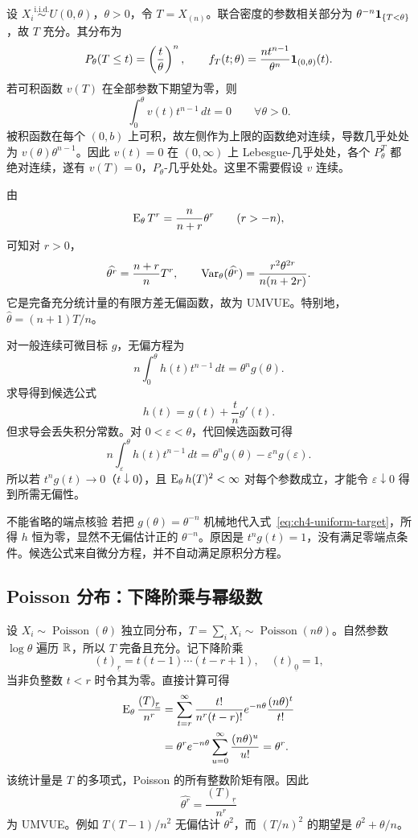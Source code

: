 设 $X_i\overset{\mathrm{i.i.d.}}\sim U(0,\theta)$，$\theta>0$，令 $T=X_{(n)}$。联合密度的参数相关部分为 $\theta^{-n}\mathbf 1_{\{T<\theta\}}$，故 $T$ 充分。其分布为
\[
 P_\theta(T\leq t)=\left(\frac t\theta\right)^n,
 \qquad
 f_T(t;\theta)=\frac{nt^{n-1}}{\theta^n}\mathbf 1_{(0,\theta)}(t).
\]
若可积函数 $v(T)$ 在全部参数下期望为零，则
\[
 \int_0^\theta v(t)t^{n-1}\,dt=0\qquad\forall\theta>0.
\]
被积函数在每个 $(0,b)$ 上可积，故左侧作为上限的函数绝对连续，导数几乎处处为 $v(\theta)\theta^{n-1}$。因此 $v(t)=0$ 在 $(0,\infty)$ 上 Lebesgue-几乎处处，各个 $P_\theta^T$ 都绝对连续，遂有 $v(T)=0$，$P_\theta$-几乎处处。这里不需要假设 $v$ 连续。

由
\[
 \operatorname{E}_\theta T^r=\frac n{n+r}\theta^r\qquad(r>-n),
\]
可知对 $r>0$，
\[
 \widehat{\theta^r}=\frac{n+r}{n}T^r,
 \qquad
 \operatorname{Var}_\theta(\widehat{\theta^r})
 =\frac{r^2\theta^{2r}}{n(n+2r)}.
\]
它是完备充分统计量的有限方差无偏函数，故为 UMVUE。特别地，$\widehat\theta=(n+1)T/n$。

对一般连续可微目标 $g$，无偏方程为
\[
 n\int_0^\theta h(t)t^{n-1}\,dt=\theta^ng(\theta).
\]
求导得到候选公式
\begin{equation}
 h(t)=g(t)+\frac tn g'(t).
 \label{eq:ch4-uniform-target}
\end{equation}
但求导会丢失积分常数。对 $0<\varepsilon<\theta$，代回候选函数可得
\[
 n\int_\varepsilon^\theta h(t)t^{n-1}\,dt
 =\theta^ng(\theta)-\varepsilon^ng(\varepsilon).
\]
所以若 $t^ng(t)\to0$（$t\downarrow0$），且 $\operatorname{E}_\theta h(T)^2<\infty$ 对每个参数成立，才能令 $\varepsilon\downarrow0$ 得到所需无偏性。

\begin{examplebox}{不能省略的端点核验}
若把 $g(\theta)=\theta^{-n}$ 机械地代入式~\eqref{eq:ch4-uniform-target}，所得 $h$ 恒为零，显然不无偏估计正的 $\theta^{-n}$。原因是 $t^ng(t)=1$，没有满足零端点条件。候选公式来自微分方程，并不自动满足原积分方程。
\end{examplebox}

\subsection{Poisson 分布：下降阶乘与幂级数}

设 $X_i\sim\operatorname{Poisson}(\theta)$ 独立同分布，$T=\sum_iX_i\sim\operatorname{Poisson}(n\theta)$。自然参数 $\log\theta$ 遍历 $\mathbb R$，所以 $T$ 完备且充分。记下降阶乘
\[
 (t)_{\underline r}=t(t-1)\cdots(t-r+1),
 \quad (t)_{\underline0}=1,
\]
当非负整数 $t<r$ 时令其为零。直接计算可得
\begin{align*}
 \operatorname{E}_\theta\frac{(T)_{\underline r}}{n^r}
 &=\sum_{t=r}^\infty
 \frac{t!}{n^r(t-r)!}e^{-n\theta}\frac{(n\theta)^t}{t!}\\
 &=\theta^r e^{-n\theta}
   \sum_{u=0}^\infty\frac{(n\theta)^u}{u!}
 =\theta^r.
\end{align*}
该统计量是 $T$ 的多项式，Poisson 的所有整数阶矩有限。因此
\[
 \widehat{\theta^r}=\frac{(T)_{\underline r}}{n^r}
\]
为 UMVUE。例如 $T(T-1)/n^2$ 无偏估计 $\theta^2$，而 $(T/n)^2$ 的期望是 $\theta^2+\theta/n$。

